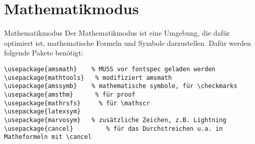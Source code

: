 \section{Mathematikmodus}

\begin{frame}[fragile]{Mathematikmodus}
Der Mathematikmodus ist eine Umgebung, die dafür optimiert ist, mathematische Formeln und Symbole darzustellen. Dafür werden folgende Pakete benötigt:
\begin{lstlisting}[style=tex]
\usepackage{amsmath}    % MUSS vor fontspec geladen werden
\usepackage{mathtools}   % modifiziert amsmath
\usepackage{amssymb}    % mathematische symbole, für \checkmarks
\usepackage{amsthm}      % für proof
\usepackage{mathrsfs}     % für \mathscr
\usepackage{latexsym}
\usepackage{marvosym}   % zusätzliche Zeichen, z.B. Lightning
\usepackage{cancel}         % für das Durchstreichen u.a. in Matheformeln mit \cancel
\end{lstlisting}
\end{frame}



